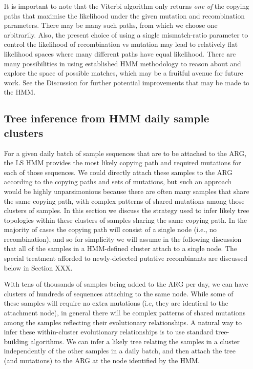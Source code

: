\documentclass{article}
\begin{document}
It is important to note that the Viterbi algorithm only returns
\emph{one of} the copying paths that maximise the likelihood under
 the given mutation and recombination parameters. There may be many
such paths, from which we choose one arbitrarily. Also, the
present choice of using a single mismatch-ratio parameter to control
the likelihood of recombination vs mutation may lead to relatively
flat likelihood spaces where many different paths have equal likelihood.
There are many possibilities in using established HMM methodology
to reason about and explore the space of possible matches, which may
be a fruitful avenue for future work. See the Discussion for further
potential improvements that may be made to the HMM.

\subsection{Tree inference from HMM daily sample clusters}
\label{sec:sample-cluster-tree-inference}
For a given daily batch of sample sequences that are to be attached to the
ARG, the LS HMM provides the most likely copying path and required mutations
for each of those sequences. We could directly attach these samples to
the ARG according to the copying paths and sets of mutations, but
such an approach would be highly unparsimonious because there are
often many samples that share the same copying path, with
complex patterns of shared mutations among those clusters of samples.
In this section we discuss the strategy used to infer likely tree
topologies within these clusters of samples sharing the same copying path.
In the majority of cases the copying path will consist of a single
node (i.e., no recombination), and so for simplicity we will assume in the
following discussion that all of the samples in a HMM-defined cluster
attach to a single node. The special treatment afforded to
newly-detected putative recombinants are discussed below
in Section XXX.

With tens of thousands of samples being added to the ARG per day,
we can have clusters of hundreds of sequences attaching to the same node.
While some of these samples will require no extra mutations
(i.e, they are identical to the attachment node), in general there
will be complex patterns of shared mutations among the samples
reflecting their evolutionary relationships. A natural way to infer
these within-cluster evolutionary relationships is to use standard
tree-building algorithms.
We can infer a likely tree relating the
samples in a cluster independently of the other samples in a
daily batch, and then attach the tree (and mutations)
to the ARG at the node identified by the HMM.
\end{document}
